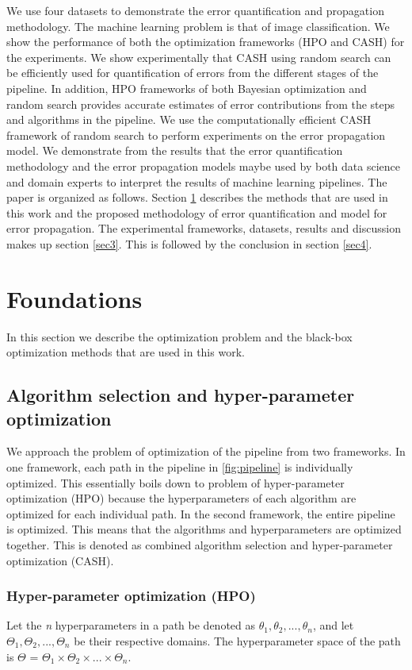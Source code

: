 We use four datasets to demonstrate the error quantification and propagation methodology. The machine learning problem is that of image classification. We show the performance of both the optimization frameworks (HPO and CASH) for the experiments. We show experimentally that CASH using random search can be efficiently used for quantification of errors from the different stages of the pipeline. In addition, HPO frameworks of both Bayesian optimization and random search provides accurate estimates of error contributions from the steps and algorithms in the pipeline. We use the computationally efficient CASH framework of random search to perform experiments on the error propagation model. We demonstrate from the results that the error quantification methodology and the error propagation models maybe used by both data science and domain experts to interpret the results of machine learning pipelines.  
The paper is organized as follows. Section \ref{sec2} describes the methods that are used in this work and the proposed methodology of error quantification and model for error propagation. The experimental frameworks, datasets, results and discussion makes up section \ref{sec3}. This is followed by the conclusion in section \ref{sec4}.

\section{Foundations}
\label{sec2}
In this section we describe the optimization problem and the black-box optimization methods that are used in this work. 
\subsection{Algorithm selection and hyper-parameter optimization}
\label{subsec_AS_HPO}
We approach the problem of optimization of the pipeline from two frameworks. In one framework, each path in the pipeline in \ref{fig:pipeline} is individually optimized. This essentially boils down to problem of hyper-parameter optimization (HPO)  because the hyperparameters of each algorithm are optimized for each individual path. In the second framework, the entire pipeline is optimized. This means that the algorithms and hyperparameters are optimized together. This is denoted as combined algorithm selection and hyper-parameter optimization (CASH).

\subsubsection{Hyper-parameter optimization (HPO)}
\label{subsubsec_HPO}
Let the \textit{n} hyperparameters in a path be denoted as $\theta_1, \theta_2, ..., \theta_n$, and let $\Theta_1, \Theta_2, ..., \Theta_n$ be their respective domains. The hyperparameter space of the path is  \textbf{$\Theta$} = $\Theta_1 \times \Theta_2 \times ... \times \Theta_n$.


